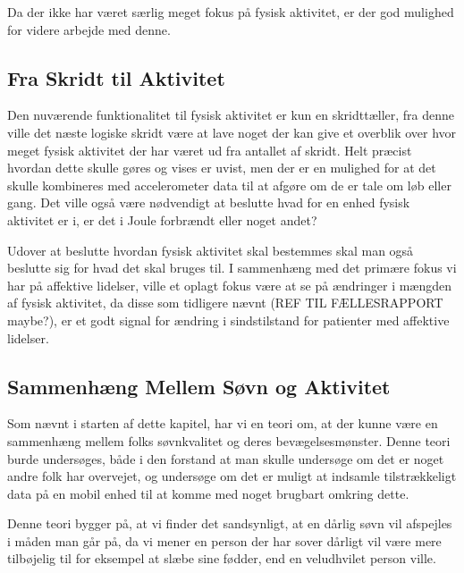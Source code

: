 Da der ikke har været særlig meget fokus på fysisk aktivitet, er der god mulighed for videre arbejde med denne.

\subsection{Fra Skridt til Aktivitet}
Den nuværende funktionalitet til fysisk aktivitet er kun en skridttæller, fra denne ville det næste logiske skridt være at lave noget der kan give et overblik over hvor meget fysisk aktivitet der har været ud fra antallet af skridt.
Helt præcist hvordan dette skulle gøres og vises er uvist, men der er en mulighed for at det skulle kombineres med accelerometer data til at afgøre om de er tale om løb eller gang.
Det ville også være nødvendigt at beslutte hvad for en enhed fysisk aktivitet er i, er det i Joule forbrændt eller noget andet?

Udover at beslutte hvordan fysisk aktivitet skal bestemmes skal man også beslutte sig for hvad det skal bruges til.
I sammenhæng med det primære fokus vi har på affektive lidelser, ville et oplagt fokus være at se på ændringer i mængden af fysisk aktivitet, da disse som tidligere nævnt (REF TIL FÆLLESRAPPORT maybe?), er et godt signal for ændring i sindstilstand for patienter med affektive lidelser.

\subsection{Sammenhæng Mellem Søvn og Aktivitet}
Som nævnt i starten af dette kapitel, har vi en teori om, at der kunne være en sammenhæng mellem folks søvnkvalitet og deres bevægelsesmønster.
Denne teori burde undersøges, både i den forstand at man skulle undersøge om det er noget andre folk har overvejet, og undersøge om det er muligt at indsamle tilstrækkeligt data på en mobil enhed til at komme med noget brugbart omkring dette.

Denne teori bygger på, at vi finder det sandsynligt, at en dårlig søvn vil afspejles i måden man går på, da vi mener en person der har sover dårligt vil være mere tilbøjelig til for eksempel at slæbe sine fødder, end en veludhvilet person ville. 